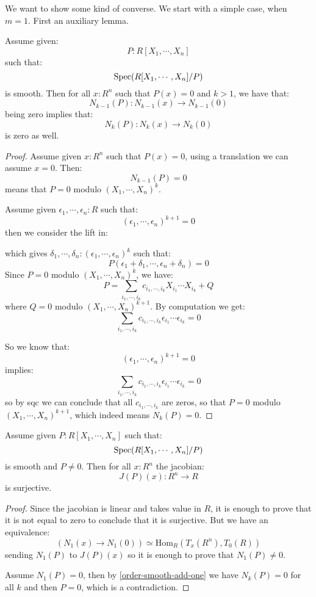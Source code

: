 We want to show some kind of converse. We start with a simple case, when $m=1$. First an auxiliary lemma.

\begin{lemma}\label{order-smooth-add-one}
Assume given:
\[P : R[X_1,\cdots,X_n]\]
such that:
\[\operatorname{Spec}(R[X_1,\cdots,X_n]/P)\] 
is smooth. Then for all $x:R^n$ such that $P(x)=0$ and $k>1$, we have that:
\[N_{k-1}(P) : N_{k-1}(x) \to N_{k-1}(0)\]
being zero implies that:
\[N_{k}(P) : N_{k}(x) \to N_{k}(0)\]
is zero as well.
\end{lemma}

\begin{proof}
Assume given $x:R^n$ such that $P(x)=0$, using a translation we can assume $x=0$. Then:
\[N_{k-1}(P) = 0\]
means that $P=0$ modulo $(X_1,\cdots,X_n)^k$.

Assume given $\epsilon_1,\cdots,\epsilon_n:R$ such that:
\[(\epsilon_1,\cdots,\epsilon_n)^{k+1}=0\]
then we consider the lift in:
 \begin{center}
    \end{center} 
    which gives $\delta_1,\cdots,\delta_n: (\epsilon_1,\cdots,\epsilon_n)^k$ such that:
    \[P(\epsilon_1+\delta_1,\cdots,\epsilon_n+\delta_n) = 0\]
    Since $P=0$ modulo $(X_1,\cdots,X_n)^k$, we have:
\[P = \sum_{i_1,\cdots,i_k} c_{i_1,\cdots,i_k} X_{i_1}\cdots X_{i_k} + Q\]
where $Q=0$ modulo $(X_1,\cdots,X_n)^{k+1}$. By computation we get:
   \[\sum_{i_1,\cdots,i_k} c_{i_1,\cdots,i_k} \epsilon_{i_1}\cdots \epsilon_{i_k} = 0\]
   
   So we know that:
   \[(\epsilon_1,\cdots,\epsilon_n)^{k+1}=0\]
   implies:
   \[\sum_{i_1,\cdots,i_k} c_{i_1,\cdots,i_k} \epsilon_{i_1}\cdots \epsilon_{i_k} = 0\]
   so by sqc we can conclude that all $c_{i_1,\cdots,i_k}$ are zeros, so that $P = 0$ modulo $(X_1,\cdots,X_n)^{k+1}$, which indeed means $N_k(P)=0$.
\end{proof}

\begin{lemma}
Assume given $P:R[X_1,\cdots,X_n]$ such that:
\[\operatorname{Spec}(R[X_1,\cdots,X_n]/P)\]
is smooth and $P\not=0$. Then for all $x:R^n$ the jacobian:
\[J(P)(x) : R^n \to R\]
is surjective.
\end{lemma}

\begin{proof}
Since the jacobian is linear and takes value in $R$, it is enough to prove that it is not equal to zero to conclude that it is surjective. But we have an equivalence:
\[(N_1(x)\to N_1(0)) \simeq \mathrm{Hom}_R(T_x(R^n),T_0(R))\]
sending $N_1(P)$ to $J(P)(x)$ so it is enough to prove that $N_1(P)\not=0$. 

Assume $N_1(P)=0$, then by \cref{order-smooth-add-one} we have $N_k(P)=0$ for all $k$ and then $P=0$, which is a contradiction.
\end{proof}


